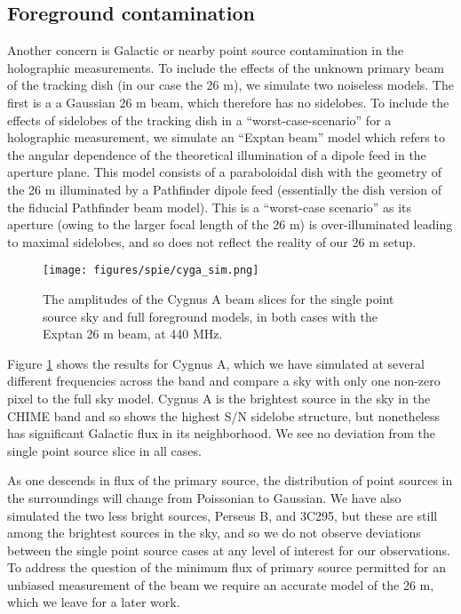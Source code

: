 \subsection{Foreground contamination}
Another concern is Galactic or nearby point source contamination in the holographic measurements. To include the effects of the unknown primary beam of the tracking dish (in our case the 26 m), we simulate two noiseless models. The first is a a Gaussian 26 m beam, which therefore has no sidelobes. To include the effects of sidelobes of the tracking dish in a ``worst-case-scenario'' for a holographic measurement, we simulate an ``Exptan beam'' model which refers to the angular dependence of the theoretical illumination of a dipole feed in the aperture plane\citep{mmodes2}. This model consists of a paraboloidal dish with the geometry of the 26 m illuminated by a Pathfinder dipole feed (essentially the dish version of the fiducial Pathfinder beam model). This is a ``worst-case scenario'' as its aperture (owing to the larger focal length of the 26 m) is over-illuminated leading to maximal sidelobes, and so does not reflect the reality of our 26 m setup.

\begin{figure}[h!] %
	\centering	
	\texttt{[image: figures/spie/cyga\_sim.png]}%
	\caption{The amplitudes of the Cygnus A beam slices for the single point source sky and full foreground models, in both cases with the Exptan 26 m beam, at 440 MHz. }
	\label{cygasim}
\end{figure}


Figure \ref{cygasim} shows the results for Cygnus A, which we have simulated at several different frequencies across the band and compare a sky with only one non-zero pixel to the full sky model. Cygnus A is the brightest source in the sky in the CHIME band and so shows the highest S/N sidelobe structure, but nonetheless has significant Galactic flux in its neighborhood. We see no deviation from the single point source slice in all cases.

As one descends in flux of the primary source, the distribution of point sources in the surroundings will change from Poissonian to Gaussian. We have also simulated the two less bright sources, Perseus B, and 3C295, but these are still among the brightest sources in the sky, and so we do not observe deviations between the single point source cases at any level of interest for our observations. To address the question of the minimum flux of primary source permitted for an unbiased measurement of the beam we require an accurate model of the 26 m, which we leave for a later work.

